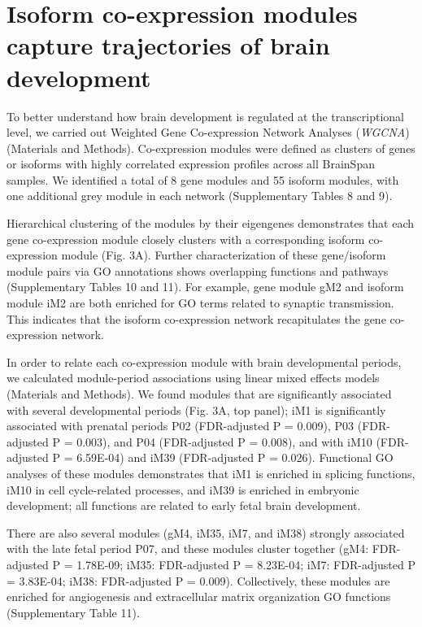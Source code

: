 \documentclass[12pt,chapterheads,final]{ucsd}
\begin{document}
\section{Isoform co-expression modules capture trajectories of brain development}
To better understand how brain development is regulated at the transcriptional level, we carried out Weighted Gene Co-expression Network Analyses (\textit{WGCNA}) \cite{Langfelder2008} (Materials and Methods). Co-expression modules were defined as clusters of genes or isoforms with highly correlated expression profiles across all BrainSpan samples. We identified a total of 8 gene modules and 55 isoform modules, with one additional grey module in each network (Supplementary Tables 8 and 9). \par
Hierarchical clustering of the modules by their eigengenes demonstrates that each gene co-expression module closely clusters with a corresponding isoform co-expression module (Fig. 3A). Further characterization of these gene/isoform module pairs via GO annotations shows overlapping functions and pathways (Supplementary Tables 10 and 11). For example, gene module gM2 and isoform module iM2 are both enriched for GO terms related to synaptic transmission. This indicates that the isoform co-expression network recapitulates the gene co-expression network. \par
In order to relate each co-expression module with brain developmental periods, we calculated module-period associations using linear mixed effects models (Materials and Methods). We found modules that are significantly associated with several developmental periods (Fig. 3A, top panel); iM1 is significantly associated with prenatal periods P02 (FDR-adjusted P = 0.009), P03 (FDR-adjusted P = 0.003), and P04 (FDR-adjusted P = 0.008), and with iM10 (FDR-adjusted P = 6.59E-04) and iM39 (FDR-adjusted P = 0.026). Functional GO analyses of these modules demonstrates that iM1 is enriched in splicing functions, iM10 in cell cycle-related processes, and iM39 is enriched in embryonic development; all functions are related to early fetal brain development. \par
There are also several modules (gM4, iM35, iM7, and iM38) strongly associated with the late fetal period P07, and these modules cluster together (gM4: FDR-adjusted P = 1.78E-09; iM35: FDR-adjusted P = 8.23E-04; iM7: FDR-adjusted P = 3.83E-04; iM38: FDR-adjusted P = 0.009). Collectively, these modules are enriched for angiogenesis and extracellular matrix organization GO functions (Supplementary Table 11). \par
\end{document}
